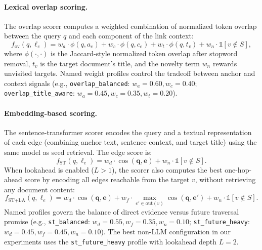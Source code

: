 \paragraph{Lexical overlap scoring.}
The overlap scorer computes a weighted combination of normalized token overlap between the query $q$ and each component of the link context:
\begin{equation}
\label{eq:overlap}
f_{\text{ov}}(q, \ell_e) = w_a \cdot \phi(q, a_e) + w_c \cdot \phi(q, c_e) + w_t \cdot \phi(q, t_{v}) + w_n \cdot \mathbb{1}[v \notin S],
\end{equation}
where $\phi(\cdot, \cdot)$ is the Jaccard-style normalized token overlap after stopword removal, $t_v$ is the target document's title, and the novelty term $w_n$ rewards unvisited targets. Named weight profiles control the tradeoff between anchor and context signals (e.g., \texttt{overlap\_balanced}: $w_a{=}0.60, w_c{=}0.40$; \texttt{overlap\_title\_aware}: $w_a{=}0.45, w_c{=}0.35, w_t{=}0.20$).

\paragraph{Embedding-based scoring.}
The sentence-transformer scorer encodes the query and a textual representation of each edge (combining anchor text, sentence context, and target title) using the same \stmodel{} model as seed retrieval. The edge score is:
\begin{equation}
\label{eq:st}
f_{\text{ST}}(q, \ell_e) = w_d \cdot \cos(\mathbf{q}, \mathbf{e}) + w_n \cdot \mathbb{1}[v \notin S].
\end{equation}
When lookahead is enabled ($L > 1$), the scorer also computes the best one-hop-ahead score by encoding all edges reachable from the target $v$, without retrieving any document content:
\begin{equation}
\label{eq:st-lookahead}
f_{\text{ST+LA}}(q, \ell_e) = w_d \cdot \cos(\mathbf{q}, \mathbf{e}) + w_f \cdot \max_{e' \in \text{out}(v)} \cos(\mathbf{q}, \mathbf{e}') + w_n \cdot \mathbb{1}[v \notin S].
\end{equation}
Named profiles govern the balance of direct evidence versus future traversal promise (e.g., \texttt{st\_balanced}: $w_d{=}0.55, w_f{=}0.35, w_n{=}0.10$; \texttt{st\_future\_heavy}: $w_d{=}0.45, w_f{=}0.45, w_n{=}0.10$). The best non-LLM configuration in our experiments uses the \texttt{st\_future\_heavy} profile with lookahead depth $L{=}2$.

